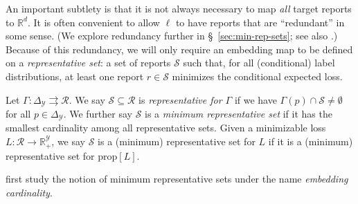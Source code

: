\documentclass[twoside,11pt]{article}
\newcommand{\Comments}{1}
\newcommand{\mytodo}[2]{\ifnum\Comments=1%
  \todo[linecolor=#1!80!black,backgroundcolor=#1,bordercolor=#1!80!black]{#2}\fi}
\newcommand{\raft}[1]{\mytodo{green!20!white}{RF: #1}}
\newcommand{\reals}{\mathbb{R}}
\newcommand{\prop}[1]{\mathrm{prop}[#1]}
\newcommand{\simplex}{\Delta_\Y}
\newcommand{\R}{\mathcal{R}}
\newcommand{\Sc}{\mathcal{S}}
\newcommand{\Y}{\mathcal{Y}}
\newcommand{\toto}{\rightrightarrows}
\begin{document}
An important subtlety is that it is not always necessary to map \emph{all} target reports to $\reals^d$.
It is often convenient to allow $\ell$ to have reports that are ``redundant'' in some sense. (We explore redundancy further in \S~\ref{sec:min-rep-sets}; see also \citet{wang2020weston}.)
Because of this redundancy, we will only require an embedding map to be defined on a \emph{representative set}: a set of reports $\Sc$ such that, for all (conditional) label distributions, at least one report $r\in\Sc$ minimizes the conditional expected loss.
\begin{definition}
  Let $\Gamma:\simplex\toto\R$.
  We say $\Sc \subseteq \R$ is \emph{representative for $\Gamma$} if we have $\Gamma(p) \cap \Sc \neq \emptyset$ for all $p\in \simplex$.
  We further say $\Sc$ is a \emph{minimum representative set} if it has the smallest cardinality among all representative sets.
  Given a minimizable loss $L:\R\to\reals^\Y_+$, we say $\Sc$ is a (minimum) representative set for $L$ if it is a (minimum) representative set for $\prop L$.
\end{definition}

\noindent
\citet{wang2020weston} first study the notion of minimum representative sets under the name \emph{embedding cardinality}.

\end{document}
